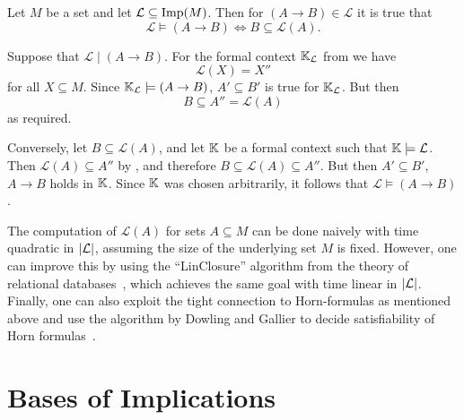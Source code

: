 \begin{Lemma}
  \label{lem:characterization-of-entailment-in-terms-of-induced-closure-operators}
  Let $M$ be a set and let $\mathcal{L} \subseteq \operatorname{Imp}(M)$.  Then for $(A \to B) \in
  \mathcal{L}$ it is true that
  \begin{equation}
    \label{eq:7}
    \mathcal{L} \models (A \to B) \iff B \subseteq \mathcal{L}(A).
  \end{equation}
\end{Lemma}
\begin{Proof}
  Suppose that $\mathcal{L} \mid (A \to B)$.  For the formal context ${\mathbb{K}}_{\mathcal{L}}$ from  we have
  \begin{equation*}
    \mathcal{L}(X) = X''
  \end{equation*}
  for all $X \subseteq M$.  Since ${\mathbb{K}}_{\mathcal{L}} \models (A \to B)$, $A' \subseteq
  B'$ is true for ${\mathbb{K}}_{\mathcal{L}}$.  But then
  \begin{equation*}
    B \subseteq A'' = \mathcal{L}(A)
  \end{equation*}
  as required.

  Conversely, let $B \subseteq \mathcal{L}(A)$, and let ${\mathbb{K}}$ be a formal context such
  that ${\mathbb{K}} \models \mathcal{L}$.  Then $\mathcal{L}(A) \subseteq A''$ by
  , and therefore $B
  \subseteq \mathcal{L}(A) \subseteq A''$.  But then $A' \subseteq B'$, \ie $A \to B$
  holds in ${\mathbb{K}}$.  Since ${\mathbb{K}}$ was chosen arbitrarily, it follows that $\mathcal{L}
  \models (A \to B)$.  
\end{Proof}

The computation of $\mathcal{L}(A)$ for sets $A \subseteq M$ can be done naively with time
quadratic in $\lvert\mathcal{L}\rvert$, assuming the size of the underlying set $M$ is fixed.
However, one can improve this by using the ``LinClosure'' algorithm from the theory of
relational databases~\cite{DBLP:books/cs/Maier83}, which achieves the same goal with time
linear in $\lvert\mathcal{L}\rvert$.  Finally, one can also exploit the tight connection to
Horn-formulas as mentioned above and use the algorithm by Dowling and Gallier to decide
satisfiability of Horn formulas~\cite{DBLP:journals/jlp/DowlingG84}.

\section{Bases of Implications}
\label{sec:bases-implications}

